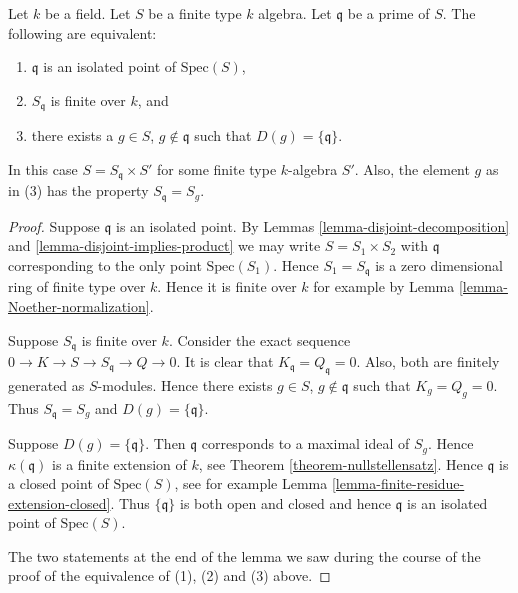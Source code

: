 \begin{lemma}
\label{lemma-isolated-point}
Let $k$ be a field.
Let $S$ be a finite type $k$ algebra.
Let $\mathfrak q$ be a prime of $S$.
The following are equivalent:
\begin{enumerate}
\item $\mathfrak q$ is an isolated point of $\text{Spec}(S)$,
\item $S_{\mathfrak q}$ is finite over $k$, and
\item there exists a $g \in S$, $g \not\in \mathfrak q$ such that
$D(g) = \{ \mathfrak q \}$.
\end{enumerate}
In this case $S = S_{\mathfrak q} \times S'$ for some
finite type $k$-algebra $S'$. Also, the element $g$
as in (3) has the property $S_{\mathfrak q} = S_g$.
\end{lemma}

\begin{proof}
Suppose $\mathfrak q$ is an isolated point.
By Lemmas \ref{lemma-disjoint-decomposition} and
\ref{lemma-disjoint-implies-product} we may
write $S = S_1 \times S_2$ with $\mathfrak q$ 
corresponding to the only point $\text{Spec}(S_1)$.
Hence $S_1 = S_{\mathfrak q}$ is a zero dimensional
ring of finite type over $k$. Hence it is finite over $k$
for example by Lemma \ref{lemma-Noether-normalization}.

\medskip\noindent
Suppose $S_{\mathfrak q}$ is finite over $k$.
Consider the exact sequence $0 \to K \to S \to S_{\mathfrak q}
\to Q \to 0$. It is clear that $K_{\mathfrak q} = Q_{\mathfrak q} = 0$.
Also, both are finitely generated as $S$-modules. Hence there
exists $g \in S$, $g \not \in \mathfrak q$ such that
$K_g = Q_g = 0$. Thus $S_{\mathfrak q} = S_g$ and
$D(g) = \{ \mathfrak q \}$.

\medskip\noindent
Suppose $D(g) =  \{ \mathfrak q \}$.
Then $\mathfrak q$ corresponds to a maximal ideal
of $S_g$. Hence $\kappa(\mathfrak q)$ is a finite
extension of $k$, see Theorem \ref{theorem-nullstellensatz}.
Hence $\mathfrak q$ is a closed point of $\text{Spec}(S)$,
see for example Lemma \ref{lemma-finite-residue-extension-closed}.
Thus $\{ \mathfrak q \}$ is both open and closed and
hence $\mathfrak q$ is an isolated point of
$\text{Spec}(S)$.

\medskip\noindent
The two statements at the end of the lemma we saw during the
course of the proof of the equivalence of (1), (2) and (3) above.
\end{proof}

